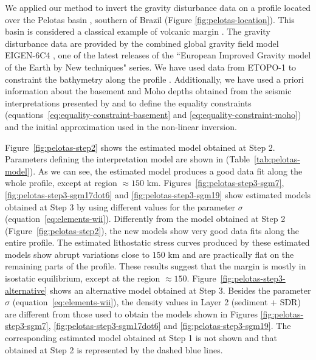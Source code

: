 \documentclass[manuscript,revised]{geophysics}
\begin{document}
We applied our method to invert the gravity disturbance data 
on a profile located over the Pelotas basin
\citep{stica-etal2014}, southern of Brazil (Figure \ref{fig:pelotas-location}). This basin is 
considered a classical example of volcanic margin \citep{geoffroy2005}.
The gravity disturbance data are provided by the combined global gravity field model EIGEN-6C4
\citep{forste2014}, one of the latest releases of the ``European Improved Gravity model of 
the Earth by New techniques" series.
We have used data from ETOPO-1 to constraint the bathymetry along the profile
\citep{amante-eakins2009}.
Additionally, we have used a priori information about the basement and Moho depths
obtained from the seismic interpretations presented by \citet{stica-etal2014} and
\citet{zalan2015} to define the equality constraints 
(equations~\ref{eq:equality-constraint-basement} and \ref{eq:equality-constraint-moho})
and the initial approximation used in the non-linear inversion. 

Figure~\ref{fig:pelotas-step2} shows the estimated model obtained at Step 2.
Parameters defining the interpretation model are shown in 
(Table~\ref{tab:pelotas-model}).
As we can see, the estimated model produces a good data fit along the whole
profile, except at region $\approx 150$ km.
Figures~\ref{fig:pelotas-step3-sgm7}, \ref{fig:pelotas-step3-sgm17dot6} and 
\ref{fig:pelotas-step3-sgm19} show estimated models obtained at
Step 3 by using different values for the parameter $\sigma$
(equation~\ref{eq:elements-wii}).
Differently from the model obtained at Step 2 (Figure~\ref{fig:pelotas-step2}), 
the new models show very good data fits along the entire profile.
The estimated lithostatic stress curves produced by these estimated models 
show abrupt variations close to $150$ km and are practically flat on the remaining parts
of the profile. These results suggest that the margin is mostly in isostatic 
equilibrium, except at the region $\approx 150$.
Figure~\ref{fig:pelotas-step3-alternative} shows an alternative 
model obtained at Step 3. 
Besides the parameter $\sigma$ (equation~\ref{eq:elements-wii}),
the density values in Layer 2 (sediment + SDR) are different from 
those used to obtain the models shown in Figures \ref{fig:pelotas-step3-sgm7},
\ref{fig:pelotas-step3-sgm17dot6} and \ref{fig:pelotas-step3-sgm19}.
The corresponding estimated model obtained at Step 1 is not shown and
that obtained at Step 2 is represented by the dashed blue lines.
\end{document}
